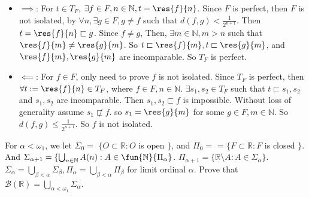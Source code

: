 \documentclass{ctexart}
\begin{document}
\begin{solution}
  \begin{itemize}
    \item \(\implies\): For \(t \in T_F\), \(\exists f \in F,n \in \mathbb{N},t =\res{f}{n}\).
      Since \(F\) is perfect, then \(F\) is not isolated,
      by  \(\forall n, \exists g \in F, g \neq f\) such that 
      \(d(f,g)<\frac{1}{2^{n+1}}\). 
      Then \(t =\res{f}{n} \sqsubset g\).
      Since \(f \neq g\), Then, \(\exists m \in \mathbb{N} , m >n\) such that 
      \(\res{f}{m}\neq \res{g}{m}\). 
      So \(t \sqsubset \res{f}{m},t \sqsubset \res{g}{m}\), and \(\res{f}{m},\res{g}{m}\) are incomparable. 
      So \(T_F\) is perfect.
    \item \(\impliedby\): For \(f \in F\), only need to prove \(f\) is not isolated.
      Since \(T_F\) is perfect, then \(\forall t:=\res{f}{n} \in T_F\), where \(f \in F, n \in \mathbb{N}\).
       \(\exists s_1,s_2 \in T_F\) such that \(t \sqsubset s_1,s_2\) and \(s_1,s_2\) are incomparable. 
      Then \(s_1,s_2 \sqsubset f\) is impossible. 
      Without loss of generality assume \(s_1 \not \sqsubset f\). 
      so \(s_1=\res{g}{m}\) for some \(g \in F,m \in \mathbb{N}\). 
      So \(d(f,g) \leq \frac{1}{2^{n + 1}}\). So \(f\) is not isolated. 
  \end{itemize}
\end{solution}

\begin{problem}
  For \(\alpha <\omega_1\), we let \(\Sigma_0=\)  \(\{O \subset\mathbb{R}: O\) is open \(\}\), 
  and \(\Pi_0=\) = \(\{F \subset\mathbb{R}: F \) is closed \(\}\). 
  And \(\Sigma_{\alpha+1}=\{\bigcup_{n \in \mathbb{N}} A(n):A \in \fun{\mathbb{N}}{\Pi_{\alpha}}\). 
  \(\Pi_{\alpha+1}=\{\mathbb{R}\setminus A:A \in \Sigma_{\alpha}\}\). 
  \(\Sigma_{\alpha}=\bigcup_{\beta<\alpha} \Sigma_{\beta},\Pi_{\alpha}=\bigcup_{\beta<\alpha} \Pi _{\beta}\) for limit ordinal \(\alpha\). 
  Prove that \(\mathcal{B}(\mathbb{R})=\bigcup_{\alpha<\omega_1} \Sigma_{\alpha}\). 
\end{problem}
\end{document}
